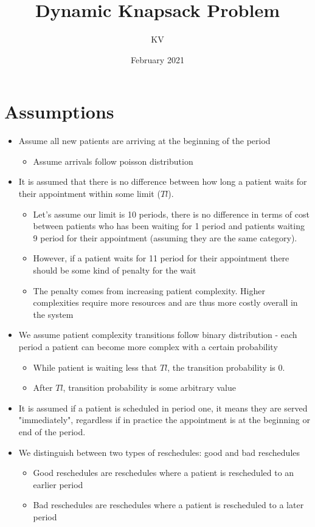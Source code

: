 \documentclass{article}
\title{Dynamic Knapsack Problem}
\author{KV}
\date{February 2021}
\begin{document}
\maketitle

\section{Assumptions} 
\begin{itemize}
	\item Assume all new patients are arriving at the beginning of the period 
	\begin{itemize}
		\item Assume arrivals follow poisson distribution
	\end{itemize}		
	
	\item It is assumed that there is no difference between how long a patient waits for their appointment within some limit ($Tl$). 
	\begin{itemize}
		\item Let's assume our limit is 10 periods, there is no difference in terms of cost between patients who has been waiting for 1 period and patients waiting 9 period for their appointment (assuming they are the same category).  
		\item However, if a patient waits for 11 period for their appointment there should be some kind of penalty for the wait
		\item The penalty comes from increasing patient complexity. Higher complexities require more resources and are thus more costly overall in the system
	\end{itemize}		
	
	\item We assume patient complexity transitions follow binary distribution - each period a patient can become more complex with a certain probability
		\begin{itemize}
			\item While patient is waiting less that $Tl$, the transition probability is 0.
			\item After $Tl$, transition probability is some arbitrary value
		\end{itemize}
	
	\item It is assumed if a patient is scheduled in period one, it means they are served "immediately", regardless if in practice the appointment is at the beginning or end of the period.
	\item We distinguish between two types of reschedules: good and bad reschedules
	\begin{itemize}
		\item Good reschedules are reschedules where a patient is rescheduled to an earlier period
		\item Bad reschedules are reschedules where a patient is rescheduled to a later period
	\end{itemize}


\end{itemize}
\end{document}
